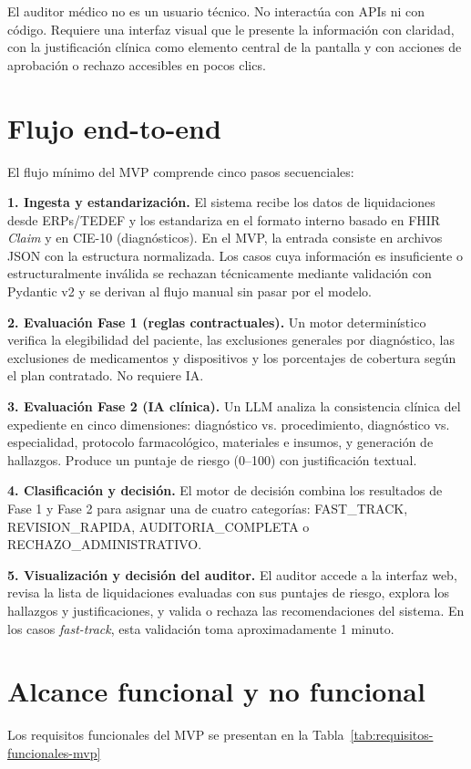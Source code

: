 El auditor médico no es un usuario técnico. No interactúa con APIs ni con código. Requiere una interfaz visual que le presente la información con claridad, con la justificación clínica como elemento central de la pantalla y con acciones de aprobación o rechazo accesibles en pocos clics.

\section{Flujo end-to-end}

El flujo mínimo del MVP comprende cinco pasos secuenciales:

\noindent \textbf{1. Ingesta y estandarización.} El sistema recibe los datos de liquidaciones desde ERPs/TEDEF y los estandariza en el formato interno basado en FHIR \textit{Claim} y en CIE-10 (diagnósticos). En el MVP, la entrada consiste en archivos JSON con la estructura normalizada. Los casos cuya información es insuficiente o estructuralmente inválida se rechazan técnicamente mediante validación con Pydantic v2 y se derivan al flujo manual sin pasar por el modelo.

\noindent \textbf{2. Evaluación Fase 1 (reglas contractuales).} Un motor determinístico verifica la elegibilidad del paciente, las exclusiones generales por diagnóstico, las exclusiones de medicamentos y dispositivos y los porcentajes de cobertura según el plan contratado. No requiere IA.

\noindent \textbf{3. Evaluación Fase 2 (IA clínica).} Un LLM analiza la consistencia clínica del expediente en cinco dimensiones: diagnóstico vs. procedimiento, diagnóstico vs. especialidad, protocolo farmacológico, materiales e insumos, y generación de hallazgos. Produce un puntaje de riesgo (0–100) con justificación textual.

\noindent \textbf{4. Clasificación y decisión.} El motor de decisión combina los resultados de Fase 1 y Fase 2 para asignar una de cuatro categorías: FAST\_TRACK, REVISION\_RAPIDA, AUDITORIA\_COMPLETA o RECHAZO\_ADMINISTRATIVO.

\noindent \textbf{5. Visualización y decisión del auditor.} El auditor accede a la interfaz web, revisa la lista de liquidaciones evaluadas con sus puntajes de riesgo, explora los hallazgos y justificaciones, y valida o rechaza las recomendaciones del sistema. En los casos \textit{fast-track}, esta validación toma aproximadamente 1 minuto.

\section{Alcance funcional y no funcional}
Los requisitos funcionales del MVP se presentan en la
Tabla~\ref{tab:requisitos-funcionales-mvp}


